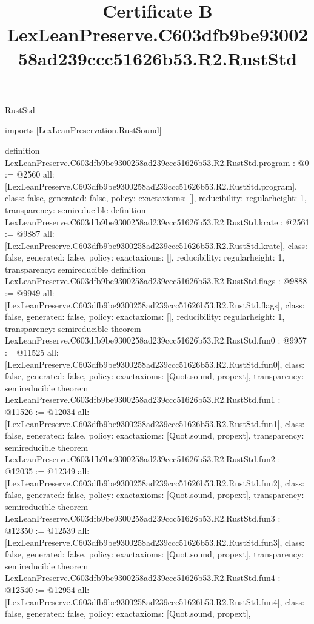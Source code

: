 \begin{lexlean}{RustStd}
\title{Certificate B LexLeanPreserve.C603dfb9be9300258ad239ccc51626b53.R2.RustStd}
\begin{coremodule}
imports [LexLeanPreservation.RustSound]

definition LexLeanPreserve.C603dfb9be9300258ad239ccc51626b53.R2.RustStd.program : @0 := @2560 {
  all: [LexLeanPreserve.C603dfb9be9300258ad239ccc51626b53.R2.RustStd.program],
  class: false,
  generated: false,
  policy: exact{axioms: []},
  reducibility: regular{height: 1},
  transparency: semireducible
}
definition LexLeanPreserve.C603dfb9be9300258ad239ccc51626b53.R2.RustStd.krate : @2561 := @9887 {
  all: [LexLeanPreserve.C603dfb9be9300258ad239ccc51626b53.R2.RustStd.krate],
  class: false,
  generated: false,
  policy: exact{axioms: []},
  reducibility: regular{height: 1},
  transparency: semireducible
}
definition LexLeanPreserve.C603dfb9be9300258ad239ccc51626b53.R2.RustStd.flags : @9888 := @9949 {
  all: [LexLeanPreserve.C603dfb9be9300258ad239ccc51626b53.R2.RustStd.flags],
  class: false,
  generated: false,
  policy: exact{axioms: []},
  reducibility: regular{height: 1},
  transparency: semireducible
}
theorem LexLeanPreserve.C603dfb9be9300258ad239ccc51626b53.R2.RustStd.fun0 : @9957 := @11525 {
  all: [LexLeanPreserve.C603dfb9be9300258ad239ccc51626b53.R2.RustStd.fun0],
  class: false,
  generated: false,
  policy: exact{axioms: [Quot.sound, propext]},
  transparency: semireducible
}
theorem LexLeanPreserve.C603dfb9be9300258ad239ccc51626b53.R2.RustStd.fun1 : @11526 := @12034 {
  all: [LexLeanPreserve.C603dfb9be9300258ad239ccc51626b53.R2.RustStd.fun1],
  class: false,
  generated: false,
  policy: exact{axioms: [Quot.sound, propext]},
  transparency: semireducible
}
theorem LexLeanPreserve.C603dfb9be9300258ad239ccc51626b53.R2.RustStd.fun2 : @12035 := @12349 {
  all: [LexLeanPreserve.C603dfb9be9300258ad239ccc51626b53.R2.RustStd.fun2],
  class: false,
  generated: false,
  policy: exact{axioms: [Quot.sound, propext]},
  transparency: semireducible
}
theorem LexLeanPreserve.C603dfb9be9300258ad239ccc51626b53.R2.RustStd.fun3 : @12350 := @12539 {
  all: [LexLeanPreserve.C603dfb9be9300258ad239ccc51626b53.R2.RustStd.fun3],
  class: false,
  generated: false,
  policy: exact{axioms: [Quot.sound, propext]},
  transparency: semireducible
}
theorem LexLeanPreserve.C603dfb9be9300258ad239ccc51626b53.R2.RustStd.fun4 : @12540 := @12954 {
  all: [LexLeanPreserve.C603dfb9be9300258ad239ccc51626b53.R2.RustStd.fun4],
  class: false,
  generated: false,
  policy: exact{axioms: [Quot.sound, propext]},
}
\end{coremodule}
\end{lexlean}
